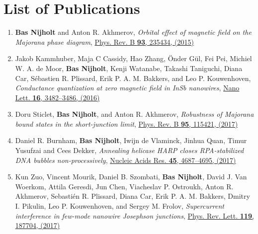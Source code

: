 \chapter*{List of Publications}
\label{publications}

\begin{enumerate}

\item \textbf{Bas Nijholt} and Anton R. Akhmerov, \textit{Orbital effect of magnetic field on the Majorana phase diagram}, \href{https://doi.org/10.1103/PhysRevB.93.235434}{Phys. Rev. B \textbf{93}, 235434, (2015)}

\item Jakob Kammhuber, Maja C Cassidy, Hao Zhang, {\"O}nder G{\"u}l, Fei Pei, Michiel W. A. de Moor, \textbf{Bas Nijholt}, Kenji Watanabe, Takashi Taniguchi, Diana Car, S{\'e}bastien R. Plissard, Erik P. A. M. Bakkers, and Leo P. Kouwenhoven, \textit{Conductance quantization at zero magnetic field in InSb nanowires}, \href{https://doi.org/10.1021/acs.nanolett.6b00051}{Nano Lett. \textbf{16}, 3482--3486, (2016)}

\item Doru Sticlet, \textbf{Bas Nijholt}, and Anton R. Akhmerov, \textit{Robustness of Majorana bound states in the short-junction limit}, \href{https://doi.org/10.1103/PhysRevB.95.115421}{Phys. Rev. B \textbf{95}, 115421, (2017)}

\item Daniel R. Burnham, \textbf{Bas Nijholt}, Iwijn de Vlaminck,  Jinhua Quan, Timur Yusufzai and Cees Dekker, \textit{Annealing helicase HARP closes RPA-stabilized DNA bubbles non-processively}, \href{https://doi.org/10.1093/nar/gkx147}{Nucleic Acids Res. \textbf{45}, 4687--4695, (2017)}

\item Kun Zuo, Vincent Mourik, Daniel B. Szombati, \textbf{Bas Nijholt}, David J. Van Woerkom, Attila Geresdi, Jun Chen, Viacheslav P. Ostroukh, Anton R. Akhmerov, Sebasti{\'e}n R. Plissard, Diana Car, Erik P. A. M. Bakkers, Dmitry I. Pikulin, Leo P. Kouwenhoven, and Sergey M. Frolov, \textit{Supercurrent interference in few-mode nanowire Josephson junctions}, \href{https://doi.org/10.1103/PhysRevLett.119.187704}{Phys. Rev. Lett. \textbf{119}, 187704, (2017)}


\end{enumerate}
